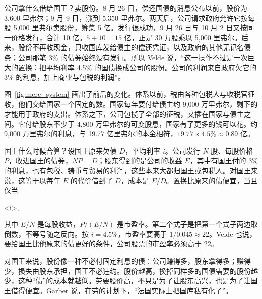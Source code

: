 公司拿什么借给国王？卖股份。8 月 26 日，偿还国债的消息公布以前，股价为 3,600 里弗尔；9 月 9 日，涨到 5,350 里弗尔。两天后，公司请求政府允许它按每股 5,000 里弗尔卖股份，筹集 5 亿。发行很成功，9 月 26 日与 10 月 2 日又按同一价格发行，合计 10 亿\cite{velde2003}。$5+10=15$ 亿，正是 30 万股乘以 5,000 里弗尔。后来，股份不再收现金，只收国库发给债主的偿还凭证，以及政府的其他无记名债务；公司那笔 3\% 的债券始终没有发行\cite{velde2003}。所以 Velde 说，“这一操作不过是一次巨大的置换：把平均利率 4.5\% 的国债换成公司的股份。公司的利润来自政府欠它的 3\% 的利息，加上商业与包税的利润”\cite{velde2003}。

图~\ref{fig:merc_system} 画出了前后的变化。体系以前，税由各种包税人与收税官征收，他们交给国家一个固定的数。国家每年要付给债主约 9,000 万里弗尔，剩下的才能用于政府的支出。体系之下，公司包揽了全部的征税，又插在国家与债主之间。它付给股东不少于 4,800 万里弗尔的可变股息，国家有了更多的钱可以花\cite{velde2003}。约 9,000 万里弗尔的利息，与 19.77 亿里弗尔的本金相符，$19.77\times4.5\%\approx0.89$ 亿。


国王什么时候合算？设国王原来欠债 $D$，平均利率 $i$。公司发行 $N$ 股、每股价格 $P$，收进国王的债券，$NP=D$；股东得到的是公司的收益 $E$，其中有国王付的 3\% 的利息，也有包税、铸币与贸易的利润，这些本来大都归国王或包税人。对国王来说，这等于以每年 $E$ 的代价借到了 $D$，成本是 $E/D$。置换比原来的债便宜，当且仅当
\begin{keyeq}
<i\qquad\Longleftrightarrow\qquad{}>,\label{eq:merc-swap}
\end{keyeq}
其中 $E/N$ 是每股收益，$P/(E/N)$ 是市盈率。第二个式子是把第一个式子两边取倒数，不等号随之反向。按 $i=4.5\%$，市盈率要高于 $1/0.045\approx22$。Velde 也说，要给国王比他原来的债更好的条件，公司股票的市盈率必须高于 22\cite{velde2003}。

\begin{intuition}[股份是一种利息可变的国债]
对国王来说，股份像一种不必付固定利息的债：公司赚得多，股东拿得多；赚得少，损失由股东承担，国王不必违约。股价越高，换掉同样多的国债需要的股份越少，这种“债”的成本就越低。劳要股价高，不只是为了让股东高兴，也是为了让国王借得便宜。Garber 说，在劳的计划下，“法国实际上把国库私有化了”\cite{garber1990}。
\end{intuition}

